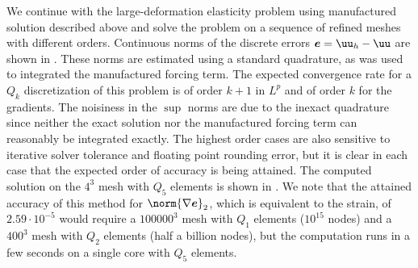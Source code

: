We continue with the large-deformation elasticity problem using manufactured solution described above and solve the problem on a sequence of refined meshes with different orders.
Continuous norms of the discrete errors $\bm e = \uu_h - \uu$ are shown in .
These norms are estimated using a standard quadrature, as was used to integrated the manufactured forcing term.
The expected convergence rate for a $Q_k$ discretization of this problem is of order $k+1$ in $L^p$ and of order $k$ for the gradients.
The noisiness in the $\sup$ norms are due to the inexact quadrature since neither the exact solution nor the manufactured forcing term can reasonably be integrated exactly.
The highest order cases are also sensitive to iterative solver tolerance and floating point rounding error, but it is clear in each case that the expected order of accuracy is being attained.
The computed solution on the $4^3$ mesh with $Q_5$ elements is shown in .
We note that the attained accuracy of this method for $\norm{\nabla \bm e}_2$, which is equivalent to the strain, of $2.59\cdot 10^{-5}$ would require a $100000^3$ mesh with $Q_1$ elements ($10^{15}$ nodes) and a $400^3$ mesh with $Q_2$ elements (half a billion nodes), but the computation runs in a few seconds on a single core with $Q_5$ elements.

